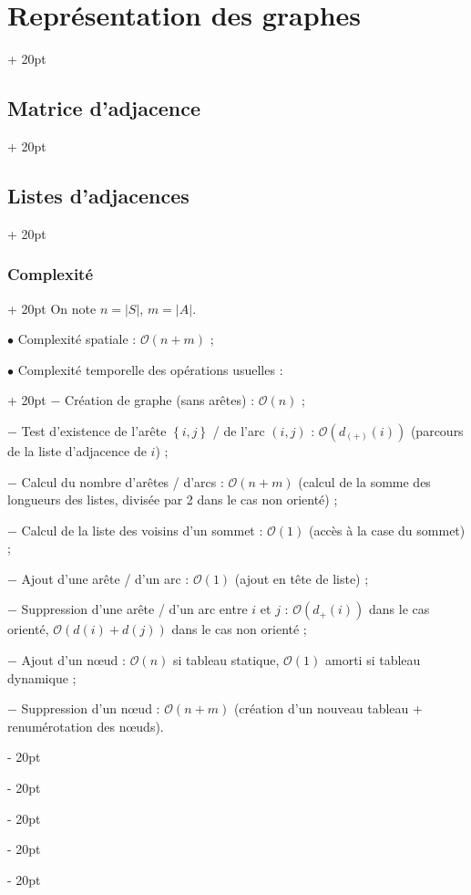 \documentclass[a4paper, 12pt, twoside]{article}
\newcommand{\lr}[1]{\left( #1 \right)}
\newcommand{\set}[1]{\left\{ #1 \right\}}
\newcommand{\abs}[1]{\left\lvert #1 \right\rvert}
\newcommand{\ind}[1][20pt]{\advance\leftskip + #1}
\newcommand{\deind}[1][20pt]{\advance\leftskip - #1}
\newenvironment{indt}[2][20pt]{#2 \par \ind[#1]}{\par \deind} %
\begin{document}
\begin{indt}{\section{Représentation des graphes}}
\begin{indt}{\subsection{Matrice d'adjacence}}
\begin{indt}{\subsection{Listes d'adjacences}}
\begin{indt}{\subsubsection{Complexité}}
                    On note $n = \abs S$, $m = \abs A$.

                    $\bullet$ Complexité spatiale : $\mathcal O(n + m)$ ;

                    \begin{indt}{$\bullet$ Complexité temporelle des opérations usuelles :}
                        $-$ Création de graphe (sans arêtes) : $\mathcal O(n)$ ;

                        $-$ Test d'existence de l'arête $\set{i, j}$ / de l'arc $(i, j)$ : $\mathcal O\!\lr{d_{(+)}(i)}$ (parcours de la liste d'adjacence de $i$) ;

                        $-$ Calcul du nombre d'arêtes / d'arcs : $\mathcal O(n + m)$ (calcul de la somme des longueurs des listes, divisée par 2 dans le cas non orienté) ;

                        $-$ Calcul de la liste des voisins d'un sommet : $\mathcal O(1)$ (accès à la case du sommet) ;

                        $-$ Ajout d'une arête / d'un arc : $\mathcal O(1)$ (ajout en tête de liste) ;

                        $-$ Suppression d'une arête / d'un arc entre $i$ et $j$ : $\mathcal O\!\lr{d_+(i)}$ dans le cas orienté, $\mathcal O\!\lr{d(i) + d(j)}$ dans le cas non orienté ;

                        $-$ Ajout d'un n\oe ud : $\mathcal O(n)$ si tableau statique, $\mathcal O(1)$ amorti si tableau dynamique ;

                        $-$ Suppression d'un n\oe ud : $\mathcal O(n + m)$ (création d'un nouveau tableau + renumérotation des n\oe uds).
                    \end{indt}
                \end{indt}
            \end{indt}
        \end{indt}
    \end{indt}

    \vspace{12pt}
    
\end{document}
